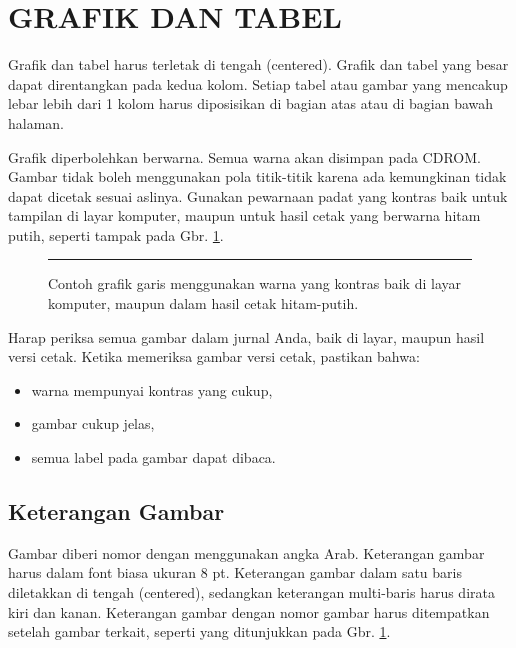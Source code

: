 \documentclass[10pt,twocolumn]{article}
\begin{document}
\twocolumn[
\begin{@twocolumnfalse}

\vspace{1em}
\end{@twocolumnfalse}
]







\section{\MakeUppercase{Grafik dan Tabel}}
Grafik dan tabel harus terletak di tengah (centered). Grafik dan tabel yang besar dapat direntangkan pada kedua kolom. Setiap tabel atau gambar yang mencakup lebar lebih dari 1 kolom harus diposisikan di bagian atas atau di bagian bawah halaman.

Grafik diperbolehkan berwarna. Semua warna akan disimpan pada CDROM. Gambar tidak boleh menggunakan pola titik-titik karena ada kemungkinan tidak dapat dicetak sesuai aslinya. Gunakan pewarnaan padat yang kontras baik untuk tampilan di layar komputer, maupun untuk hasil cetak yang berwarna hitam putih, seperti tampak pada Gbr. \ref{fig:contoh_grafik}.

\begin{figure}[h]
\centering
\rule{\columnwidth}{3cm} %
\caption{\eightp Contoh grafik garis menggunakan warna yang kontras baik di layar komputer, maupun dalam hasil cetak hitam-putih.}
\label{fig:contoh_grafik}
\end{figure}

Harap periksa semua gambar dalam jurnal Anda, baik di layar, maupun hasil versi cetak. Ketika memeriksa gambar versi cetak, pastikan bahwa:
\begin{itemize}
\item warna mempunyai kontras yang cukup,
\item gambar cukup jelas,
\item semua label pada gambar dapat dibaca.
\end{itemize}

\subsection{Keterangan Gambar}
Gambar diberi nomor dengan menggunakan angka Arab. Keterangan gambar harus dalam font biasa ukuran 8 pt. Keterangan gambar dalam satu baris diletakkan di tengah (centered), sedangkan keterangan multi-baris harus dirata kiri dan kanan. Keterangan gambar dengan nomor gambar harus ditempatkan setelah gambar terkait, seperti yang ditunjukkan pada Gbr. \ref{fig:contoh_grafik}.
\end{document}
